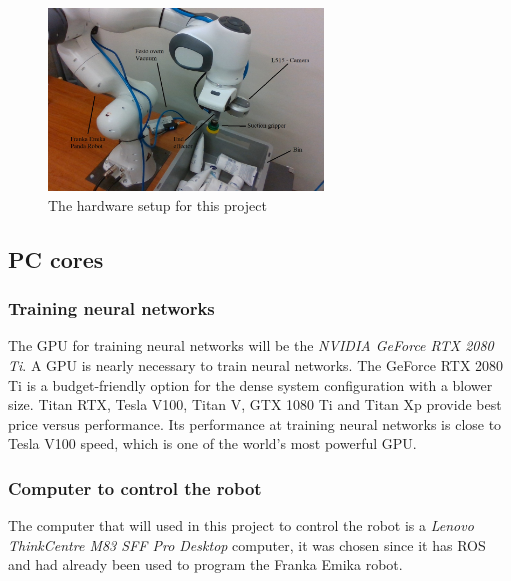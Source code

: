 \begin{figure}[h]
    \centering
    \includegraphics[width = 0.65\textwidth]{graphics/setup.jpg}
    \caption{The hardware setup for this project}
    \label{fig:setupproject}
\end{figure}
\linespread{0}
\subsection{PC cores}
\vspace{0.8cm}
\subsubsection*{Training neural networks}
The GPU for training neural networks will be the \textit{NVIDIA GeForce RTX 2080 Ti}\cite{noauthor_graphics_nodate}.
A GPU is nearly necessary to train neural networks. The GeForce RTX 2080 Ti is a budget-friendly option for the dense system configuration with a blower size. Titan RTX, Tesla V100, Titan V, GTX 1080 Ti and Titan Xp provide best price versus performance. Its performance at training neural networks is close to Tesla V100 speed, which is one of the world's most powerful GPU\cite{noauthor_deep_2018}. 

\subsubsection*{Computer to control the robot}
The computer that will used in this project to control the robot is a \textit{Lenovo ThinkCentre M83 SFF Pro Desktop}\cite{noauthor_thinkcentre_nodate} computer, it was chosen since it has ROS and had already been used to program the Franka Emika robot. 

\clearpage

